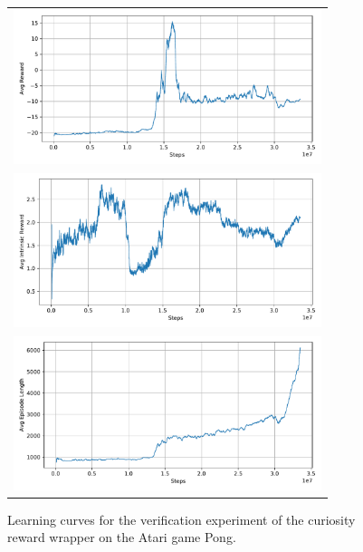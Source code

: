 \begin{figure}[ht]
    \begin{center}
    \begin{tabular}{c}
    \includegraphics[clip, height=4.5cm]{figures/implementation/rnd_pong_episode_reward.pdf} \\
    \includegraphics[clip, height=4.5cm]{figures/implementation/rnd_pong_episode_intrinsic_reward.pdf} \\
    \includegraphics[clip, height=4.5cm]{figures/implementation/rnd_pong_episode_length.pdf} \\
    
    \end{tabular}
    \end{center}
    \caption[RND on Pong]{Learning curves for the verification experiment of the curiosity reward wrapper on the Atari game Pong.}
    \label{fig:RNDPong}
  \end{figure}



